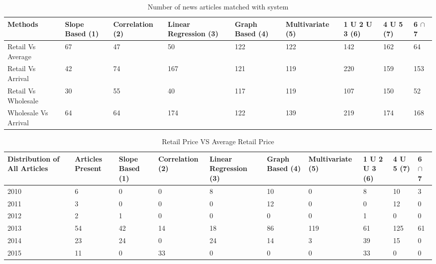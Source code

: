 \documentclass[a4paper,10pt]{report}
\begin{document}
	\begin{table}[]
	\centering
	
	\resizebox{\textwidth}{!}
	{\begin{tabular}{|l|l|l|l|l|l|l|l|l|}
	\hline
	Methods              & Slope Based (1) & Correlation (2) & Linear Regression (3) & Graph Based (4) & Multivariate (5) & 1 U 2 U 3 (6) & 4 U 5 (7) & 6 $\cap$ 7   \\
	\hline
	Retail Vs Average    & 67 & 47 & 50  & 122 & 122 & 142 & 162 & 64  \\
	\hline
	Retail Vs Arrival    & 42 & 74 & 167 & 121 & 119 & 220 & 159 & 153 \\
	\hline
	Retail Vs Wholesale  & 30 & 55 & 40  & 117 & 119 & 107 & 150 & 52  \\
	\hline
	Wholesale Vs Arrival & 64 & 64 & 174 & 122 & 139 & 219 & 174 & 168 \\
	\hline
	\end{tabular}}
	\caption{Number of news articles matched with system}
	\label{ArticlesMatched}
	\end{table}
	
      

	\begin{table}[]
	\centering
	\resizebox{\textwidth}{!}
	{\begin{tabular}{|l|l|l|l|l|l|l|l|l|l|}
	\hline
	Distribution of All Articles & Articles Present & Slope Based (1) & Correlation (2) & Linear Regression (3) & Graph Based (4) & Multivariate (5) & 1 U 2 U 3 (6) & 4 U 5 (7) & 6 $\cap$ 7 \\
	\hline
	2010 & 6  & 0  & 0  & 8  & 10 & 0   & 8  & 10  & 3  \\
	\hline
	2011 & 3  & 0  & 0  & 0  & 12 & 0   & 0  & 12  & 0  \\
	\hline
	2012 & 2  & 1  & 0  & 0  & 0  & 0   & 1  & 0   & 0  \\
	\hline
	2013 & 54 & 42 & 14 & 18 & 86 & 119 & 61 & 125 & 61 \\
	\hline
	2014 & 23 & 24 & 0  & 24 & 14 & 3   & 39 & 15  & 0  \\
	\hline
	2015 & 11 & 0  & 33 & 0  & 0  & 0   & 33 & 0   & 0  \\
	\hline
	\end{tabular}}	
	\caption{Retail Price VS Average Retail Price}
	\label{RetailVsAverage}
	\end{table}
	
	
	
\end{document}
